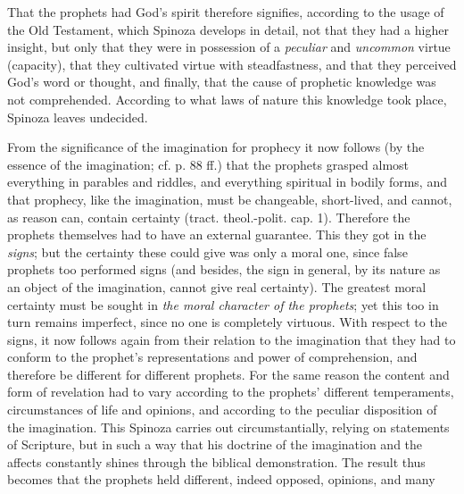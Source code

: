 \documentclass[12pt,a4paper,openany]{book}
\begin{document}
That the prophets had God's spirit therefore signifies, according to the usage of the Old Testament, which Spinoza develops in detail, not that they had a higher insight, but only that they were in possession of a \emph{peculiar} and \emph{uncommon} virtue (capacity), that they cultivated virtue with steadfastness, and that they perceived God's word or thought, and finally, that the cause of prophetic knowledge was not comprehended. According to what laws of nature this knowledge took place, Spinoza leaves undecided.

From the significance of the imagination for prophecy it now follows (by the essence of the imagination; cf. p. 88 ff.) that the prophets grasped almost everything in parables and riddles, and everything spiritual in bodily forms, and that prophecy, like the imagination, must be changeable, short-lived, and cannot, as reason can, contain certainty (tract. theol.-polit. cap. 1). Therefore the prophets themselves had to have an external guarantee. This they got in the \emph{signs}; but the certainty these could give was only a moral one, since false prophets too performed signs (and besides, the sign in general, by its nature as an object of the imagination, cannot give real certainty). The greatest moral certainty must be sought in \emph{the moral character of the prophets}; yet this too in turn remains imperfect, since no one is completely virtuous. With respect to the signs, it now follows again from their relation to the imagination that they had to conform to the prophet's representations and power of comprehension, and therefore be different for different prophets. For the same reason the content and form of revelation had to vary according to the prophets' different temperaments, circumstances of life and opinions, and according to the peculiar disposition of the imagination. This Spinoza carries out circumstantially, relying on statements of Scripture, but in such a way that his doctrine of the imagination and the affects constantly shines through the biblical demonstration. The result thus becomes that the prophets held different, indeed opposed, opinions, and many
\end{document}
